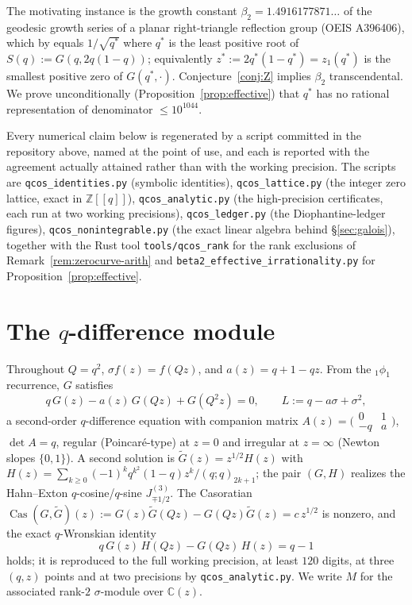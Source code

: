 \documentclass[11pt]{article}
\theoremstyle{plain}
\theoremstyle{definition}
\theoremstyle{remark}
\newcommand{\Z}{\mathbb{Z}}
\newcommand{\C}{\mathbb{C}}
\DeclareMathOperator{\Cas}{Cas}
\begin{document}
The motivating instance is the growth constant $\beta_2=1.4916177871\ldots$ of the geodesic growth
series of a planar right-triangle reflection group (OEIS A396406), which by \cite{Bonfioli2}
equals $1/\sqrt{q^\ast}$ where
$q^\ast$ is the least positive root of $S(q):=G(q,2q(1-q))$; equivalently $z^\ast:=2q^\ast(1-q^\ast)=
z_1(q^\ast)$ is the smallest positive zero of $G(q^\ast,\cdot)$. Conjecture~\ref{conj:Z} implies
$\beta_2$ transcendental. We prove unconditionally (Proposition~\ref{prop:effective}) that $q^\ast$ has
no rational representation of denominator $\le10^{1044}$.

Every numerical claim below is regenerated by a script committed in the repository above, named at
the point of use, and each is reported with the agreement actually attained rather than with the
working precision. The scripts are \texttt{qcos\_identities.py} (symbolic identities),
\texttt{qcos\_lattice.py} (the integer zero lattice, exact in $\Z[[q]]$),
\texttt{qcos\_analytic.py} (the high-precision certificates, each run at two working precisions),
\texttt{qcos\_ledger.py} (the Diophantine-ledger figures), \texttt{qcos\_nonintegrable.py} (the
exact linear algebra behind \S\ref{sec:galois}), together with the Rust tool
\texttt{tools/qcos\_rank} for the rank exclusions of Remark~\ref{rem:zerocurve-arith} and
\texttt{beta2\_effective\_irrationality.py} for Proposition~\ref{prop:effective}.

\section{The $q$-difference module}\label{sec:prelim}

Throughout $Q=q^2$, $\sigma f(z)=f(Qz)$, and $a(z)=q+1-qz$. From the ${}_1\phi_1$ recurrence, $G$
satisfies
\begin{equation}\label{eq:Leq}
   q\,G(z)-a(z)\,G(Qz)+G(Q^2z)=0,\qquad L:=q-a\sigma+\sigma^2,
\end{equation}
a second-order $q$-difference equation with companion matrix $A(z)=\bigl(\begin{smallmatrix}0&1\\-q&
a\end{smallmatrix}\bigr)$, $\det A=q$, regular (Poincar\'e-type) at $z=0$ and irregular at $z=\infty$
(Newton slopes $\{0,1\}$). A second solution is $\widetilde G(z)=z^{1/2}H(z)$ with
$H(z)=\sum_{k\ge0}(-1)^kq^{k^2}(1-q)z^k/(q;q)_{2k+1}$; the pair $(G,H)$ realizes the Hahn--Exton
$q$-cosine/$q$-sine $J^{(3)}_{\mp1/2}$. The Casoratian $\Cas(G,\widetilde G)(z):=G(z)\widetilde
G(Qz)-G(Qz)\widetilde G(z)=c\,z^{1/2}$ is nonzero, and the exact $q$-Wronskian identity
\begin{equation}\label{eq:qwron}
   q\,G(z)\,H(Qz)-G(Qz)\,H(z)=q-1
\end{equation}
holds; it is reproduced to the full working precision, at least $120$ digits, at three
$(q,z)$ points and at two precisions by \texttt{qcos\_analytic.py}. We write $M$ for the associated rank-$2$ $\sigma$-module over $\C(z)$.
\end{document}
